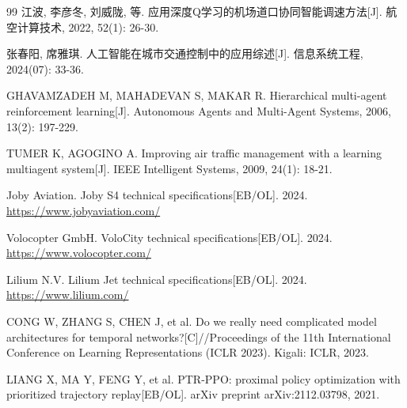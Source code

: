 \documentclass[12pt,a4paper,UTF8]{ctexart}
\begin{document}
\begin{thebibliography}{99}
 江波, 李彦冬, 刘威陇, 等. 应用深度Q学习的机场道口协同智能调速方法[J]. 航空计算技术, 2022, 52(1): 26-30.

 张春阳, 席雅琪. 人工智能在城市交通控制中的应用综述[J]. 信息系统工程, 2024(07): 33-36.

 GHAVAMZADEH M, MAHADEVAN S, MAKAR R. Hierarchical multi-agent reinforcement learning[J]. Autonomous Agents and Multi-Agent Systems, 2006, 13(2): 197-229.

 TUMER K, AGOGINO A. Improving air traffic management with a learning multiagent system[J]. IEEE Intelligent Systems, 2009, 24(1): 18-21.

 Joby Aviation. Joby S4 technical specifications[EB/OL]. 2024. \url{https://www.jobyaviation.com/}

 Volocopter GmbH. VoloCity technical specifications[EB/OL]. 2024. \url{https://www.volocopter.com/}

 Lilium N.V. Lilium Jet technical specifications[EB/OL]. 2024. \url{https://www.lilium.com/}

 CONG W, ZHANG S, CHEN J, et al. Do we really need complicated model architectures for temporal networks?[C]//Proceedings of the 11th International Conference on Learning Representations (ICLR 2023). Kigali: ICLR, 2023.

 LIANG X, MA Y, FENG Y, et al. PTR-PPO: proximal policy optimization with prioritized trajectory replay[EB/OL]. arXiv preprint arXiv:2112.03798, 2021.

\end{thebibliography}
\end{document}
